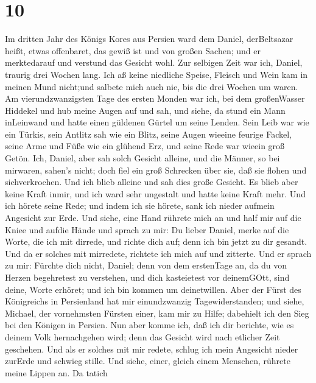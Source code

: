 \hypertarget{section-9}{%
\section{10}\label{section-9}}

 Im dritten Jahr des Königs Kores aus Persien ward dem
Daniel, derBeltsazar heißt, etwas offenbaret, das gewiß ist und von
großen Sachen; und er merktedarauf und verstund das Gesicht wohl.
 Zur selbigen Zeit war ich, Daniel, traurig drei Wochen
lang.  Ich aß keine niedliche Speise, Fleisch und Wein kam
in meinen Mund nicht;und salbete mich auch nie, bis die drei Wochen um
waren.  Am vierundzwanzigsten Tage des ersten Monden war
ich, bei dem großenWasser Hiddekel  und hub meine Augen auf
und sah, und siehe, da stund ein Mann inLeinwand und hatte einen
güldenen Gürtel um seine Lenden.  Sein Leib war wie ein
Türkis, sein Antlitz sah wie ein Blitz, seine Augen wieeine feurige
Fackel, seine Arme und Füße wie ein glühend Erz, und seine Rede war
wieein groß Getön.  Ich, Daniel, aber sah solch Gesicht
alleine, und die Männer, so bei mirwaren, sahen's nicht; doch fiel ein
groß Schrecken über sie, daß sie flohen und sichverkrochen. 
Und ich blieb alleine und sah dies große Gesicht. Es blieb aber keine
Kraft inmir, und ich ward sehr ungestalt und hatte keine Kraft mehr.
 Und ich hörete seine Rede; und indem ich sie hörete, sank
ich nieder aufmein Angesicht zur Erde.  Und siehe, eine
Hand rührete mich an und half mir auf die Kniee und aufdie Hände
 und sprach zu mir: Du lieber Daniel, merke auf die Worte,
die ich mit dirrede, und richte dich auf; denn ich bin jetzt zu dir
gesandt. Und da er solches mit mirredete, richtete ich mich auf und
zitterte.  Und er sprach zu mir: Fürchte dich nicht,
Daniel; denn von dem erstenTage an, da du von Herzen begehretest zu
verstehen, und dich kasteietest vor deinemGOtt, sind deine, Worte
erhöret; und ich bin kommen um deinetwillen.  Aber der
Fürst des Königreichs in Persienland hat mir einundzwanzig
Tagewiderstanden; und siehe, Michael, der vornehmsten Fürsten einer, kam
mir zu Hilfe; dabehielt ich den Sieg bei den Königen in Persien.
 Nun aber komme ich, daß ich dir berichte, wie es deinem
Volk hernachgehen wird; denn das Gesicht wird nach etlicher Zeit
geschehen.  Und als er solches mit mir redete, schlug ich
mein Angesicht nieder zurErde und schwieg stille.  Und
siehe, einer, gleich einem Menschen, rührete meine Lippen an. Da tatich
